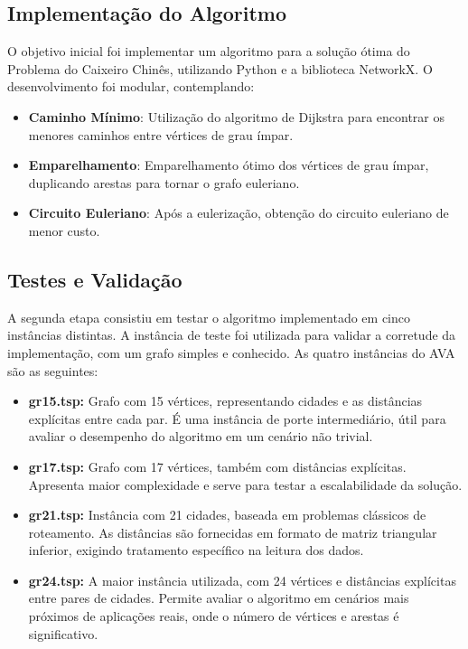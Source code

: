 \documentclass[12pt]{article}
\begin{document}
\subsection{Implementação do Algoritmo}

O objetivo inicial foi implementar um algoritmo para a solução ótima do Problema do Caixeiro Chinês, utilizando Python e a biblioteca NetworkX. O desenvolvimento foi modular, contemplando:

\begin{itemize}
    \item \textbf{Caminho Mínimo}: Utilização do algoritmo de Dijkstra para encontrar os menores caminhos entre vértices de grau ímpar.
    \item \textbf{Emparelhamento}: Emparelhamento ótimo dos vértices de grau ímpar, duplicando arestas para tornar o grafo euleriano.
    \item \textbf{Circuito Euleriano}: Após a eulerização, obtenção do circuito euleriano de menor custo.
\end{itemize}

\subsection{Testes e Validação}

A segunda etapa consistiu em testar o algoritmo implementado em cinco instâncias distintas. A instância de teste foi utilizada para validar a corretude da implementação, com um grafo simples e conhecido. As quatro instâncias do AVA são as seguintes:

\begin{itemize}
    \item \textbf{gr15.tsp:} Grafo com 15 vértices, representando cidades e as distâncias explícitas entre cada par. É uma instância de porte intermediário, útil para avaliar o desempenho do algoritmo em um cenário não trivial.
    
    \item \textbf{gr17.tsp:} Grafo com 17 vértices, também com distâncias explícitas. Apresenta maior complexidade e serve para testar a escalabilidade da solução.
    
    \item \textbf{gr21.tsp:} Instância com 21 cidades, baseada em problemas clássicos de roteamento. As distâncias são fornecidas em formato de matriz triangular inferior, exigindo tratamento específico na leitura dos dados.
    
    \item \textbf{gr24.tsp:} A maior instância utilizada, com 24 vértices e distâncias explícitas entre pares de cidades. Permite avaliar o algoritmo em cenários mais próximos de aplicações reais, onde o número de vértices e arestas é significativo.
\end{itemize}
\end{document}
